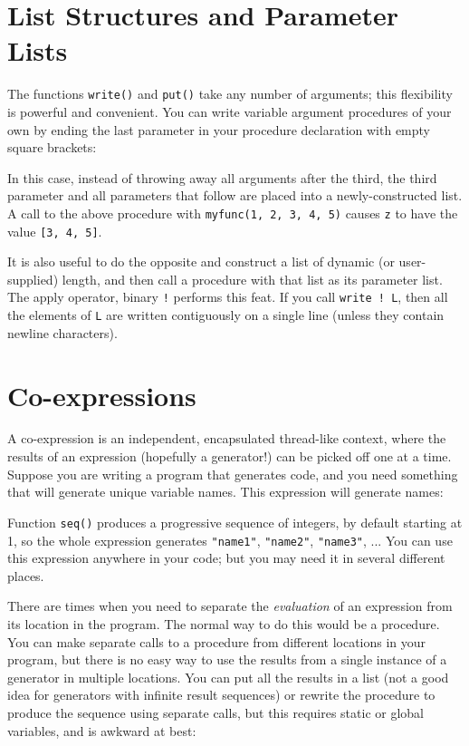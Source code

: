 \section{List Structures and Parameter Lists}

The functions \texttt{write()} and \texttt{put()} take any number of
arguments; this flexibility is powerful and convenient.
You can write variable argument
procedures of your own by ending the last parameter in your procedure
declaration with empty square brackets:


\noindent
In this case, instead of throwing away all arguments after the third,
the third parameter and all parameters that follow are placed into a
newly-constructed list. A call to the above procedure with
\texttt{myfunc(1, 2, 3, 4, 5)} causes \texttt{z} to have the value
\texttt{[3, 4, 5]}.

It is also useful to do the opposite and construct a list
of dynamic (or user-supplied) length, and then call a
procedure with that list as its parameter list. The
apply operator, binary
\texttt{!} performs this feat. If you call \texttt{write ! L}, then all
the elements of \texttt{L} are written contiguously on a single line
(unless they contain newline characters).

\section{Co-expressions}

A co-expression is an independent, encapsulated
thread{}-like context, where the results of an expression
(hopefully a generator!) can be picked off one at a time.
Suppose you are writing a program that generates
code, and you need something that will generate unique variable names.
This expression will generate names:


\noindent
Function \texttt{seq()} produces a progressive sequence
of integers, by default starting at 1, so the whole expression
generates \texttt{"name1"},
\texttt{"name2"},
\texttt{"name3"}, ... You can
use this expression anywhere in your code; but you may need
it in several different places.

There are times when you need to separate the {\em evaluation\/} of an
expression from its location in the program. The normal
way to do this would be a procedure. You can make separate calls
to a procedure from different locations in your program, but there is
no easy way to use the results from a single instance
of a generator in multiple locations. You can put all the results in a
list (not a good idea for generators with infinite result sequences) or
rewrite the procedure to produce the sequence using separate calls, but
this requires static or global variables, and is awkward at best:

